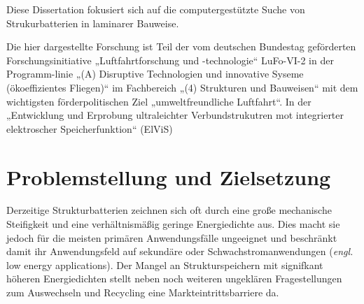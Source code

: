 Diese Dissertation fokusiert sich auf die computergestützte Suche von Strukurbatterien in laminarer Bauweise.

Die hier dargestellte Forschung ist Teil der vom deutschen Bundestag geförderten Forschungsinitiative „Luftfahrtforschung und -technologie“ LuFo-VI-2 in der Programm-linie „(A) Disruptive Technologien und innovative Syseme (ökoeffizientes Fliegen)“ im Fachbereich „(4) Strukturen und Bauweisen“ mit dem wichtigsten förderpolitischen Ziel „umweltfreundliche Luftfahrt“. In der „Entwicklung und Erprobung ultraleichter Verbundstrukutren mot integrierter elektroscher Speicherfunktion“ (ElViS)


\section{\label{sec:Motivation_Zielstellung}Problemstellung und Zielsetzung}



Derzeitige Strukturbatterien zeichnen sich oft durch eine große mechanische Steifigkeit und eine verhältnismäßig geringe Energiedichte aus. Dies macht sie jedoch für die meisten primären Anwendungsfälle ungeeignet und beschränkt damit ihr Anwendungsfeld auf sekundäre oder Schwachstromanwendungen (\textit{engl.} low energy applications). Der Mangel an Strukturspeichern mit signifkant höheren Energiedichten stellt neben noch weiteren ungeklären Fragestellungen zum Auswechseln und Recycling eine Markteintrittsbarriere da.

